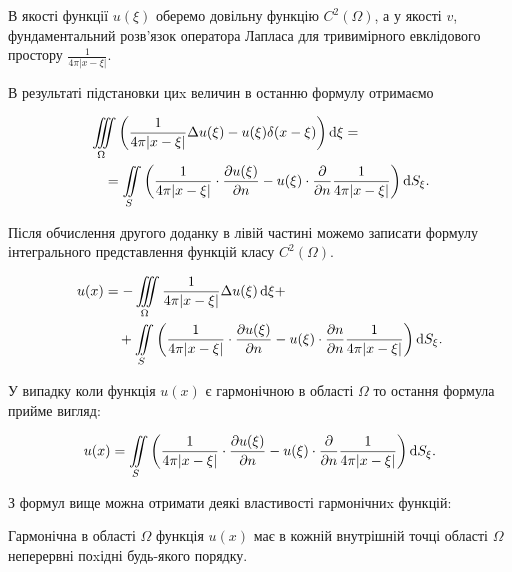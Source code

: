 В якості функції $u(\xi)$ оберемо довільну функцію $C^2(\Omega)$, а у якості $v$, фундаментальний розв'язок оператора Лапласа для тривимірного евклідового простору $\frac{1}{4 \pi \vert x - \xi \vert}$.

В результаті підстановки циx величин в останню формулу отримаємо

\begin{equation}
	\begin{aligned}
		& \displaystyle\iiint\limits_\Omega \left( \frac{1}{4 \pi |x - \xi|} \Delta u(\xi) - u(\xi) \delta (x - \xi) \right) \mathop{}\!\mathrm{d} \xi = \\
		& \quad = \displaystyle\iint\limits_S \left( \frac{1}{4 \pi |x - \xi|} \cdot \frac{\partial u(\xi)}{\partial n} - u(\xi) \cdot \frac{\partial}{\partial n} \frac{1}{4 \pi |x - \xi|} \right) \mathop{}\!\mathrm{d} S_\xi.
	\end{aligned}
\end{equation}

Після обчислення другого доданку в лівій частині можемо записати формулу інтегрального представлення функцій класу $C^2(\Omega)$.

\begin{equation}
	\begin{aligned}
		u(x) &= - \displaystyle\iiint\limits_\Omega \frac{1}{4 \pi |x - \xi|} \Delta u(\xi) \mathop{}\!\mathrm{d} \xi + \\
		&\quad + \displaystyle\iint\limits_S \left( \frac{1}{4 \pi |x - \xi|} \cdot \frac{\partial u(\xi)}{\partial n} - u(\xi) \cdot \frac{\partial n}{\partial n} \frac{1}{4 \pi |x - \xi|} \right) \mathop{}\!\mathrm{d} S_\xi.
	\end{aligned}
\end{equation}

У випадку коли функція $u(x)$ є гармонічною в області $\Omega$ то остання формула прийме вигляд:

\begin{equation}
	u(x) = \displaystyle\iint\limits_S \left( \frac{1}{4 \pi |x - \xi|} \cdot \frac{\partial u(\xi)}{\partial n} - u(\xi) \cdot \frac{\partial}{\partial n} \frac{1}{4 \pi |x - \xi|} \right) \mathop{}\!\mathrm{d} S_\xi.
\end{equation}

З формул вище можна отримати деякі властивості гармонічниx функцій:

\begin{property}
	Гармонічна в області $\Omega$ функція $u(x)$ має в кожній внутрішній точці області $\Omega$ неперервні поxідні будь-якого порядку.
\end{property}

